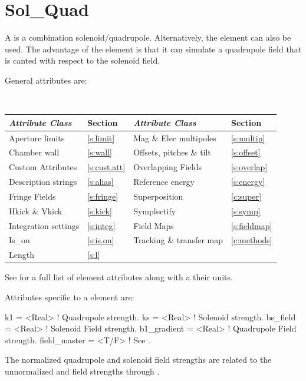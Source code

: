 {\newpage

\section{Sol_Quad}
\label{s:sq}

A  is a combination solenoid/quadrupole. Alternatively, the  element
can also be used. The advantage of the  element is that it can simulate a
quadrupole field that is canted with respect to the solenoid field.

General  attributes are:
\begin{center}
\tt
\begin{tabular}{llll} \toprule
  {\sl Attribute Class}      & Section           & {\sl Attribute Class}      & Section            \\ \midrule
  Aperture limits            & \ref{s:limit}     & Mag \& Elec multipoles     & \ref{s:multip}     \\
  Chamber wall               & \ref{s:wall}      & Offsets, pitches \& tilt   & \ref{s:offset}     \\
  Custom Attributes          & \ref{s:cust.att}  & Overlapping Fields         & \ref{s:overlap}    \\
  Description strings        & \ref{s:alias}     & Reference energy           & \ref{s:energy}     \\ 
  Fringe Fields              & \ref{s:fringe}    & Superposition              & \ref{c:super}      \\
  Hkick \& Vkick             & \ref{s:kick}      & Symplectify                & \ref{s:symp}       \\
  Integration settings       & \ref{s:integ}     & Field Maps                 & \ref{s:fieldmap}   \\
  Is_on                      & \ref{s:is.on}     & Tracking \& transfer map   & \ref{c:methods}    \\ 
  Length                     & \ref{s:l}         &                            &                    \\ 
  \bottomrule
\end{tabular}
\end{center}
\toffset
See  for a full list of element attributes along with a their units.

Attributes specific to a  element are:
\begin{example}
  k1           = <Real>    ! Quadrupole strength.
  ks           = <Real>    ! Solenoid strength.
  bs_field     = <Real>    ! Solenoid Field strength.
  b1_gradient  = <Real>    ! Quadrupole Field strength.
  field_master = <T/F>     ! See .
\end{example}
The normalized quadrupole  and solenoid  field strengths are related to the
unnormalized  and  field strengths through .

}
